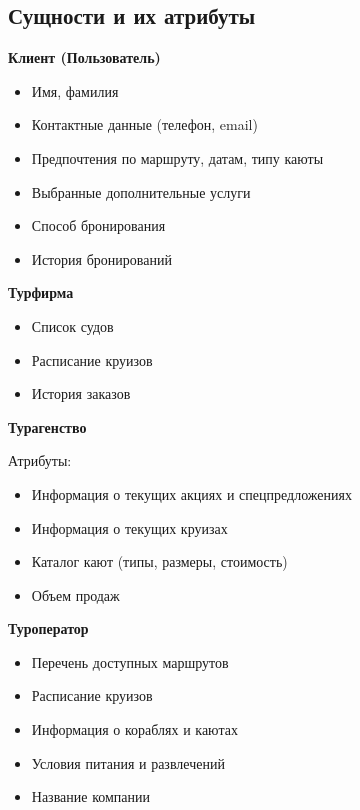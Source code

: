 \documentclass[11pt,a4paper,final]{article}
\begin{document}
\newpage
\subsection{Сущности и их атрибуты}
\begin{enumerate}
\item {\bf{Клиент (Пользователь)}}

\begin{itemize}
\item Имя, фамилия
\item Контактные данные (телефон, email)
\item Предпочтения по маршруту, датам, типу каюты
\item Выбранные дополнительные услуги
\item Способ бронирования
\item История бронирований
\end{itemize}

\item {\bf{Турфирма}}

\begin{itemize}
\item Список судов
\item Расписание круизов
\item История заказов

\end{itemize}

\item {\bf{Турагенство}}

{{Атрибуты:}
\begin{itemize}
\item Информация о текущих акциях и спецпредложениях
\item Информация о текущих круизах
\item Каталог кают (типы, размеры, стоимость)
\item Объем продаж 
\end{itemize}

\item {\bf{Туроператор}}

\begin{itemize}
\item Перечень доступных маршрутов
\item Расписание круизов
\item Информация о кораблях и каютах
\item Условия питания и развлечений
\item Название компании

\end{itemize}

}
\end{enumerate}
\end{document}
